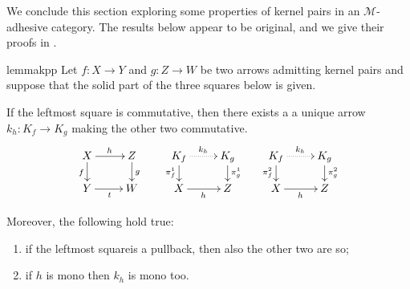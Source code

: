 \documentclass[a4paper,UKenglish,cleveref,pdftex,thm-restate,numberwithinsect]{lipics-v2021}
\def\D{\textbf {\textup{D}}}
\def\X{\textbf {\textup{X}}}
\newcommand{\commentato}[1]{ {} }
\begin{document}
\commentato{ 
\begin{restatable}{corollary}{natepi}\label{cor:reg_epi_components_reg_epi_nat_trans}
    Let $\X$ be a category with pullbacks and $\phi\colon F \to G$ a natural transformation between functors $F, G: \D \rightrightarrows \X$. If $\phi_d$ is a regular epi for every $d$, then $\phi$ is a regular epi.
\end{restatable}

From the previous result we deduce that the class of regular epis is closed under colimits.

\begin{restatable}{lemma}{epicol}\label{lemma:nat_trans_reg_epi_canonical_arrow_reg_epi}
    Let $F,G\colon \D\rightrightarrows \X$ be two diagrams, and suppose that $\X$ has all colimits of shape $\D$. Let $(X, \{x_d\}_{d \in \D})$ and $(Y, \{y_d\}_{d\in D})$ be the colimits of $F$ and $G$, respectively.  If $\phi\colon  F \to G$ is a natural transformation whose components are regular epis, then the arrow induced by $\phi$ from $X$ to $Y$ is a regular epi.
\end{restatable}
}
We conclude this section exploring some properties of kernel pairs in an $\mathcal{M}$-adhesive category. 
The results below appear to be original, and we give their proofs in .

\begin{restatable}{lemma}{kpp}\label{lemma:kern_pairs_pres_pullbacks}
	Let $f\colon X \to Y$ and $g\colon Z \to W$ be two arrows admitting kernel pairs and suppose that the solid part of the three squares below is given. 
	
	If the leftmost square is commutative, then there exists a a unique arrow $k_h: K_f \to K_g$ making the other two commutative.
	\[\xymatrix@R=15pt{X \ar[r]^{h}\ar[d]_{f}& Z \ar[d]^{g} & K_f \ar@{.>}[r]^{k_h} \ar[d]_{\pi^1_f}& K_g \ar[d]^{\pi^1_g} & K_f  \ar@{.>}[r]^{k_h} \ar[d]_{\pi^2_f}& K_g \ar[d]^{\pi^2_g}\\ Y \ar[r]_t& W & X \ar[r]_{h} & Z & X\ar[r]_{h} &Z}\]
	
		Moreover, the following hold true:
		\begin{enumerate}
			\item if the leftmost squareis a pullback, then also the other two are so;
			\item if $h$ is mono then $k_h$ is mono too.
		\end{enumerate} 
\end{restatable}
\end{document}
